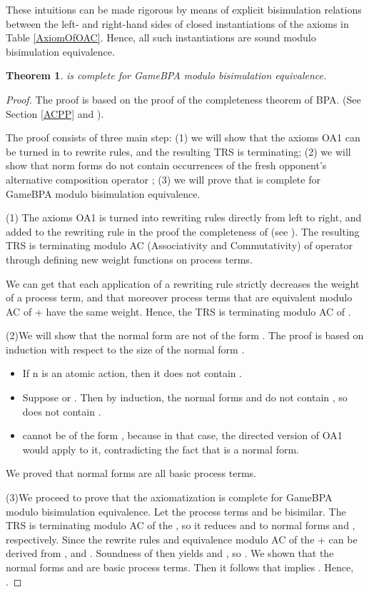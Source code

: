 \documentclass{fac}
\newtheorem{theorem}{Theorem}[section]
\begin{document}
These intuitions can be made rigorous by means of explicit bisimulation relations between the left- and right-hand sides of closed instantiations of the axioms in Table \ref{AxiomOfOAC}. Hence, all such instantiations are sound modulo bisimulation equivalence.

\begin{theorem}
 is complete for GameBPA modulo bisimulation equivalence.
\end{theorem}

\begin{proof}
The proof is based on the proof of the completeness theorem of BPA. (See Section \ref{ACPP} and \cite{ACP}).

The proof consists of three main step: (1) we will show that the axioms OA1 can be turned in to rewrite rules, and the resulting TRS is terminating; (2) we will show that norm forms do not contain occurrences of the fresh opponent's alternative composition operator ; (3) we will prove that  is complete for GameBPA modulo bisimulation equivalence.

(1) The axioms OA1 is turned into rewriting rules directly from left to right, and added to the rewriting rule in the proof the completeness of  (see \cite{ACP}). The resulting TRS is terminating modulo AC (Associativity and Commutativity) of  operator through defining new weight functions on process terms.



We can get that each application of a rewriting rule strictly decreases the weight of a process term, and that moreover process terms that are equivalent modulo AC of + have the same weight. Hence, the TRS is terminating modulo AC of .

(2)We will show that the normal form  are not of the form . The proof is based on induction with respect to the size of the normal form .

\begin{itemize}
  \item If n is an atomic action, then it does not contain .
  \item Suppose  or . Then by induction, the normal forms  and  do not contain , so  does not contain .
  \item  cannot be of the form , because in that case, the directed version of OA1 would apply to it, contradicting the fact that  is a normal form.
\end{itemize}

We proved that normal forms are all basic process terms.

(3)We proceed to prove that the axiomatization  is complete for GameBPA modulo bisimulation equivalence. Let the process terms  and  be bisimilar. The TRS is terminating modulo AC of the , so it reduces  and  to normal forms  and , respectively. Since the rewrite rules and equivalence modulo AC of the + can be derived from ,  and . Soundness of  then yields  and , so . We shown that the normal forms  and  are basic process terms. Then it follows that  implies . Hence, .
\end{proof}
\end{document}
